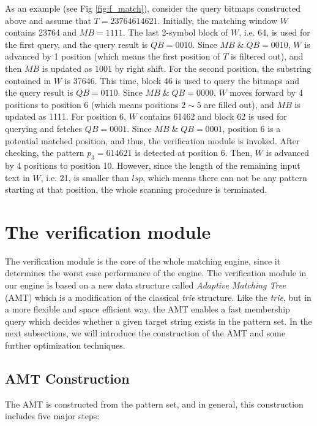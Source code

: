 As an example (see Fig \ref{fig:f_match}), consider the query bitmaps
constructed above and assume that $T=23764614621$.  Initially, the
matching window $W$ contains 23764 and $MB = 1111$.  The last 2-symbol
block of $W$, i.e. 64, is used for the first query, and the query
result is $QB=0010$. Since $MB\; \&\; QB = 0010$, $W$ is advanced by 1
position (which means the first position of $T$ is filtered out), and
then $MB$ is updated as $1001$ by right shift. For the second
position, the substring contained in $W$ is 37646. This time, block 46
is used to query the bitmaps and the query result is $QB=0110$. Since
$MB\; \& \; QB=0000$, $W$ moves forward by 4 positions to position 6
(which means positions $2 \sim 5$ are filled out), and $MB$ is updated
as 1111. For position 6, $W$ contains 61462 and block 62 is used for
querying and fetches $QB = 0001$. Since $MB\; \& \; QB = 0001$,
position 6 is a potential matched position, and thus, the verification
module is invoked. After checking, the pattern $p_3=614621$ is
detected at position 6. Then, $W$ is advanced by 4 positions to
position 10. However, since the length of the remaining input text in
$W$, i.e. 21, is smaller than $lsp$, which means there can not be any
pattern starting at that position, the whole scanning procedure is
terminated.

\section{The verification module}
\label{sec:verification}

The verification module is the core of the whole matching engine,
since it determines the worst case performance of the engine. The
verification module in our engine is based on a new data structure
called \emph{Adaptive Matching Tree} (AMT) which is a modification of
the classical \emph{trie} structure. Like the \emph{trie}, but in a
more flexible and space efficient way, the AMT enables a fast
membership query which decides whether a given target string exists in
the pattern set. In the next subsections, we will introduce the
construction of the AMT and some further optimization techniques.

\subsection{AMT Construction}
\label{subsec:amt}

The AMT is constructed from the pattern set, and in general, this
construction includes five major steps:

